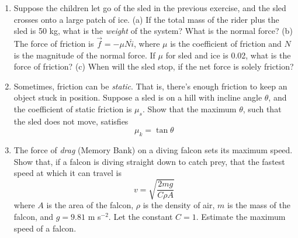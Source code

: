 \documentclass{article}
\begin{document}
\begin{enumerate}
\item Suppose the children let go of the sled in the previous exercise, and the sled crosses onto a large patch of ice.  (a) If the total mass of the rider plus the sled is 50 kg, what is the \textit{weight} of the system? What is the normal force? (b) The force of friction is $\vec{f} = -\mu N\hat{i}$, where $\mu$ is the coefficient of friction and $N$ is the magnitude of the normal force.  If $\mu$ for sled and ice is 0.02, what is the force of friction? (c) When will the sled stop, if the net force is solely friction? \\ \vspace{3cm}
\item Sometimes, friction can be \textit{static}.  That is, there's enough friction to keep an object stuck in position.  Suppose a sled is on a hill with incline angle $\theta$, and the coefficient of static friction is $\mu_s$.  Show that the maximum $\theta$, such that the sled does not move, satisfies
\begin{equation}
\mu_k = \tan\theta
\end{equation}
\vspace{2cm}
\item The force of \textit{drag} (Memory Bank) on a diving falcon sets its maximum speed.  Show that, if a falcon is diving straight down to catch prey, that the fastest speed at which it can travel is
\begin{equation}
v = \sqrt{\frac{2mg}{C\rho A}}
\end{equation}
where $A$ is the area of the falcon, $\rho$ is the density of air, $m$ is the mass of the falcon, and $g = 9.81$ m s$^{-2}$.  Let the constant $C = 1$.  Estimate the maximum speed of a falcon.
\end{enumerate}
\end{document}
